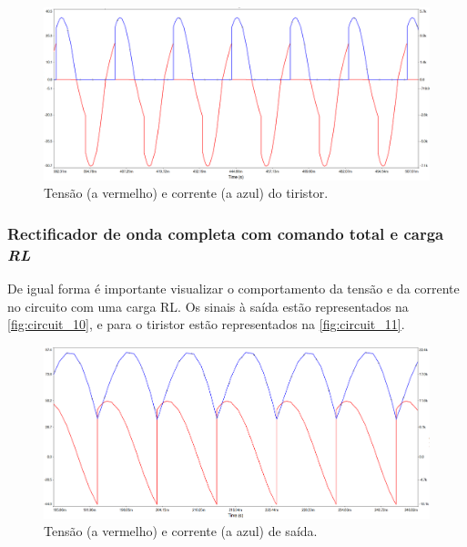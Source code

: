 \documentclass[a4paper,11pt]{article}
\numberwithin{equation}{section}
\begin{document}
\begin{figure}[h]
	\centering
	\includegraphics[keepaspectratio=true, scale=0.4]{img/circuito7}
	\caption{Tensão (a vermelho) e corrente (a azul) do tiristor.}
	\label{fig:circuit_9}
	\vspace{-0.8em}
\end{figure}

\vspace{12mm}

\subsubsection{Rectificador de onda completa com comando total e carga \textit{RL}}

De igual forma é importante visualizar o comportamento da tensão e da corrente no circuito com uma carga RL. Os sinais à saída estão representados na \autoref{fig:circuit_10}, e para o tiristor estão representados na \autoref{fig:circuit_11}.
\pagebreak

\begin{figure}[h]
	\centering
	\includegraphics[keepaspectratio=true, scale=0.4]{img/circuito8}
	\caption{Tensão (a vermelho) e corrente (a azul) de saída.}
	\label{fig:circuit_10}
	\vspace{-0.8em}
\end{figure}
\end{document}
